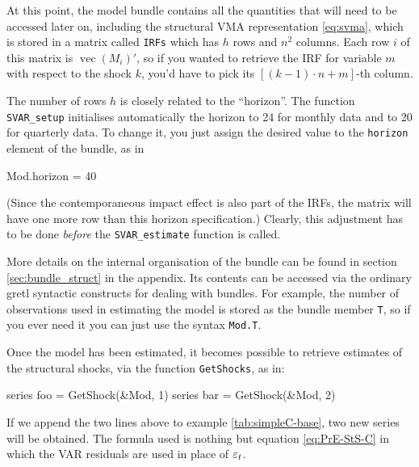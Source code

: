 \documentclass[a4paper,10pt]{article}
\newcommand{\app}[1]{\textsf{#1}}
\newcommand{\PrE}[1]{\ensuremath \varepsilon_{#1}}
\DeclareMathOperator{\VEC}{\mathrm{vec}}
\begin{document}
At this point, the model bundle contains all the quantities that will
need to be accessed later on, including the structural VMA
representation \eqref{eq:svma}, which is stored in a matrix called
\texttt{IRFs} which has $h$ rows and $n^2$ columns. Each row $i$ of
this matrix is $\VEC(M_i)'$, so if you wanted to retrieve the IRF for
variable $m$ with respect to the shock $k$, you'd have to pick its
$[(k-1)\cdot n + m]$-th column.

The number of rows $h$ is closely related to the ``horizon''. The function
\texttt{SVAR\_setup} initialises automatically the horizon to 24 for
monthly data and to 20 for quarterly data. To change it, you just
assign the desired value to the \texttt{horizon} element of the
bundle, as in
\begin{code}
  Mod.horizon = 40
\end{code}
(Since the contemporaneous impact effect is also part of the IRFs, the 
matrix will have one more row than this horizon specification.)
Clearly, this adjustment has to be done \emph{before} the
\texttt{SVAR\_estimate} function is called.
 
More details on the internal organisation of the bundle can be
found in section \ref{sec:bundle_struct} in the appendix. Its contents
can be accessed via the ordinary \app{gretl} syntactic constructs for
dealing with bundles. For example, the number of observations used in
estimating the model is stored as the bundle member \texttt{T}, so
if you ever need it you can just use the syntax \texttt{Mod.T}.

Once the model has been estimated, it becomes possible to retrieve
estimates of the structural shocks, via the function
\texttt{GetShocks}, as in:
\begin{code}
  series foo = GetShock(&Mod, 1)
  series bar = GetShock(&Mod, 2)
\end{code}
If we append the two lines above to example \ref{tab:simpleC-base},
two new series will be obtained. The formula used is nothing but
equation \eqref{eq:PrE-StS-C} in which the VAR residuals are used in
place of $\PrE{t}$.

\bigskip
\end{document}
